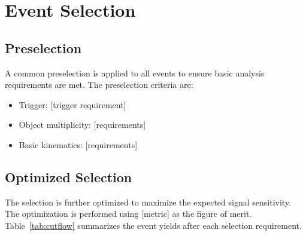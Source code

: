 
\section{Event Selection}
\label{sec:selection}


\subsection{Preselection}
\label{sec:selection:preselection}


A common preselection is applied to all events to ensure basic analysis
requirements are met. The preselection criteria are:
\begin{itemize}
  \item Trigger: [trigger requirement]
  \item Object multiplicity: [requirements]
  \item Basic kinematics: [requirements]
\end{itemize}

\subsection{Optimized Selection}
\label{sec:selection:optimized}


The selection is further optimized to maximize the expected signal sensitivity.
The optimization is performed using [metric] as the figure of merit.
Table~\ref{tab:cutflow} summarizes the event yields after each selection
requirement.


